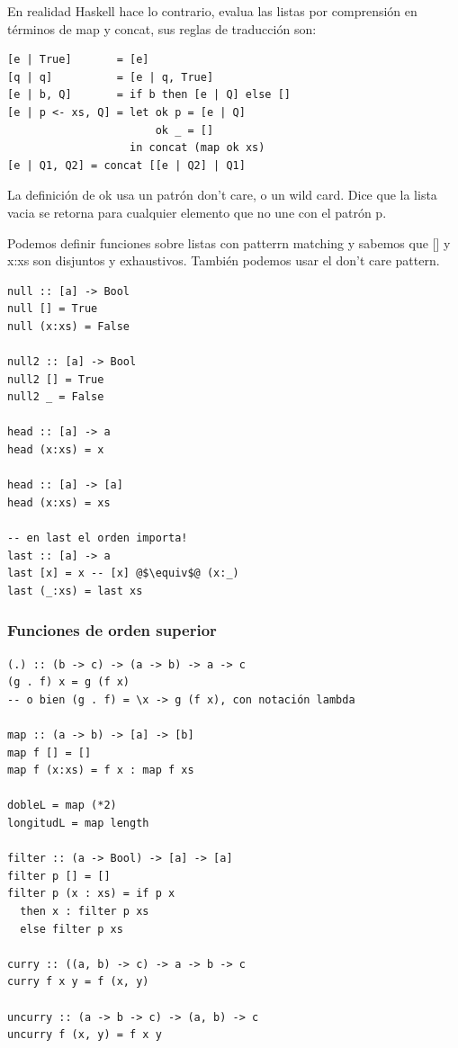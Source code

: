 \documentclass[12pt]{extarticle}
\begin{document}
En realidad Haskell hace lo contrario, evalua las listas por comprensión en términos de map y concat, sus reglas de traducción son:

\begin{verbatim}
[e | True]       = [e]
[q | q]          = [e | q, True]
[e | b, Q]       = if b then [e | Q] else []
[e | p <- xs, Q] = let ok p = [e | Q]
                       ok _ = []
                   in concat (map ok xs)
[e | Q1, Q2] = concat [[e | Q2] | Q1]
\end{verbatim}

La definición de ok usa un patrón don't care, o un wild card. Dice que la lista vacia se retorna para cualquier elemento que no une con el patrón p.

Podemos definir funciones sobre listas con patterrn matching y sabemos que [] y x:xs son disjuntos y exhaustivos. También podemos usar el don't care pattern.

\begin{verbatim}
null :: [a] -> Bool
null [] = True
null (x:xs) = False

null2 :: [a] -> Bool
null2 [] = True
null2 _ = False

head :: [a] -> a
head (x:xs) = x

head :: [a] -> [a]
head (x:xs) = xs

-- en last el orden importa!
last :: [a] -> a
last [x] = x -- [x] @$\equiv$@ (x:_)
last (_:xs) = last xs 
\end{verbatim}

\subsubsection{Funciones de orden superior}
\begin{verbatim}
(.) :: (b -> c) -> (a -> b) -> a -> c
(g . f) x = g (f x)
-- o bien (g . f) = \x -> g (f x), con notación lambda

map :: (a -> b) -> [a] -> [b]
map f [] = []
map f (x:xs) = f x : map f xs

dobleL = map (*2)
longitudL = map length

filter :: (a -> Bool) -> [a] -> [a]
filter p [] = []
filter p (x : xs) = if p x 
  then x : filter p xs 
  else filter p xs

curry :: ((a, b) -> c) -> a -> b -> c
curry f x y = f (x, y)

uncurry :: (a -> b -> c) -> (a, b) -> c
uncurry f (x, y) = f x y
\end{verbatim}
\end{document}
